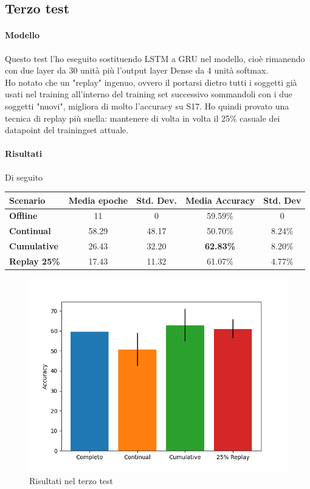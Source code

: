 \documentclass[11pt, a4paper, twoside, openright]{book}
\begin{document}
\subsection{Terzo test}
\paragraph{Modello} Questo test l'ho eseguito sostituendo LSTM a GRU nel modello, cioè rimanendo con due layer da 30 unità più l'output layer Dense da 4 unità softmax.\\
Ho notato che un "replay" ingenuo, ovvero il portarsi dietro tutti i soggetti già usati nel training all'interno del training set successivo sommandoli con i due soggetti "nuovi", migliora di molto l'accuracy su S17. Ho quindi provato una tecnica di replay più snella: mantenere di volta in volta il 25\% casuale dei datapoint del trainingset attuale.
\paragraph{Risultati} Di seguito\\
\begin{tabular}{l|c|c|c|c}
    \textbf{Scenario} & \textbf{Media epoche} & \textbf{Std. Dev.} & \textbf{Media Accuracy} & \textbf{Std. Dev} \\
    \hline 
    \textbf{Offline} & 11 & 0 & 59.59\% & 0 \\
    \textbf{Continual} & 58.29 & 48.17 & 50.70\% & 8.24\%\\
    \textbf{Cumulative} & 26.43 & 32.20 & \textbf{62.83\%} & 8.20\%\\
    \textbf{Replay 25\%} & 17.43 & 11.32 & 61.07\% & 4.77\%\\
\end{tabular}
\begin{figure}
    \centering
    \includegraphics[scale=0.75]{img/third.png}
    \caption{Risultati nel terzo test}
    \label{fig:third}
\end{figure}
\pagebreak
\end{document}
